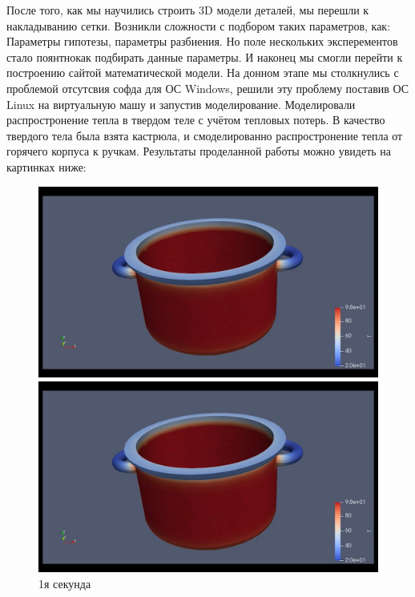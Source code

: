 \documentclass[a4paper,12pt]{article}
\theoremstyle{plain} %
\theoremstyle{definition} %
\theoremstyle{remark} %
\begin{document}
После того, как мы научились строить 3D модели деталей, мы перешли к накладыванию сетки. Возникли сложности с подбором таких параметров, как: Параметры гипотезы, параметры разбиения. Но поле нескольких эксперементов стало поянтнокак подбирать данные параметры.
И наконец мы смогли перейти к построению сайтой математической модели. На донном этапе мы столкнулись с проблемой отсутсвия софда для ОС Windows, решили эту проблему поставив ОС Linux на виртуальную машу и запустив моделирование. Моделировали распростронение тепла в твердом теле с учётом тепловых потерь. В качество твердого тела была взята кастрюла, и смоделированно распростронение тепла от горячего корпуса к ручкам. Результаты проделанной работы можно увидеть на картинках ниже:
\newpage
	\begin{figure}[h]
		\begin{center}
			\begin{minipage}[h]{0.4\linewidth}
				\includegraphics[width=1\linewidth]{1s}
				\caption{1я секунда} %
			\end{minipage}
			\hfill
			\begin{minipage}[h]{0.4\linewidth}
				\includegraphics[width=1\linewidth]{2s}

\end{minipage}
\end{center}
\end{figure}
\end{document}
